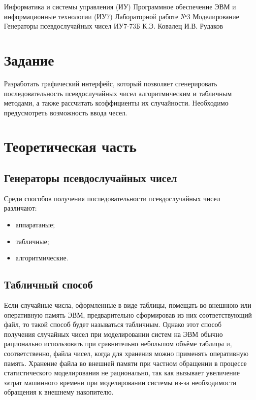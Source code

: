\documentclass{bmstu}
\begin{document}
\makereporttitle
{Информатика и системы управления (ИУ)}
{Программное обеспечение ЭВМ и информационные технологии (ИУ7)}
{Лабораторной работе №3}
{Моделирование}
{Генераторы псевдослучайных чисел}
{}
{ИУ7-73Б}
{К.Э. Ковалец}
{И.В. Рудаков}


\setcounter{page}{2}
\renewcommand{\contentsname}{Содержание} 
\tableofcontents

\chapter{Задание}

Разработать графический интерфейс, который позволяет сгенерировать последовательность псевдослучайных чисел алгоритмическим и табличным методами, а также рассчитать коэффициенты их случайности. Необходимо предусмотреть возможность ввода чесел.


\chapter{Теоретическая часть}

\section{Генераторы псевдослучайных чисел}

Среди способов получения последовательности псевдослучайных чисел различают:

\begin{itemize}
    \item аппаратаные;
    \item табличные;
    \item алгоритмические.
\end{itemize}

\section{Табличный способ}

Если случайные числа, оформленные в виде таблицы, помещать во внешнюю или оперативную память ЭВМ, предварительно сформировав из них соответствующий файл, то такой способ будет называться табличным. Однако этот способ получения случайных чисел при моделировании систем на ЭВМ обычно рационально использовать при сравнительно небольшом объёме таблицы и, соответственно, файла чисел, когда для хранения можно применять оперативную память. Хранение файла во внешней памяти при частном обращении в процессе статистического моделирования не рационально, так как вызывает увеличение затрат машинного времени при моделировании системы из-за необходимости обращения к внешнему накопителю.
\end{document}
